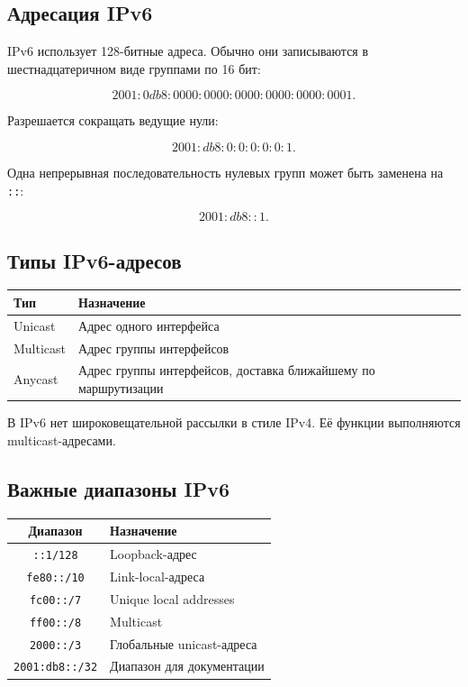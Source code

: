 \documentclass[12pt,a4paper]{article}
\begin{document}
\subsection{Адресация IPv6}

IPv6 использует 128-битные адреса. Обычно они записываются в шестнадцатеричном виде группами по 16 бит:

\[
2001:0db8:0000:0000:0000:0000:0000:0001.
\]

Разрешается сокращать ведущие нули:

\[
2001:db8:0:0:0:0:0:1.
\]

Одна непрерывная последовательность нулевых групп может быть заменена на \texttt{::}:

\[
2001:db8::1.
\]

\subsection{Типы IPv6-адресов}

\begin{center}
\begin{tabular}{|p{4cm}|p{9cm}|}
\hline
\textbf{Тип} & \textbf{Назначение} \\
\hline
Unicast & Адрес одного интерфейса \\
\hline
Multicast & Адрес группы интерфейсов \\
\hline
Anycast & Адрес группы интерфейсов, доставка ближайшему по маршрутизации \\
\hline
\end{tabular}
\end{center}

В IPv6 нет широковещательной рассылки в стиле IPv4. Её функции выполняются multicast-адресами.

\subsection{Важные диапазоны IPv6}

\begin{center}
\begin{tabular}{|c|p{8cm}|}
\hline
\textbf{Диапазон} & \textbf{Назначение} \\
\hline
\texttt{::1/128} & Loopback-адрес \\
\hline
\texttt{fe80::/10} & Link-local-адреса \\
\hline
\texttt{fc00::/7} & Unique local addresses \\
\hline
\texttt{ff00::/8} & Multicast \\
\hline
\texttt{2000::/3} & Глобальные unicast-адреса \\
\hline
\texttt{2001:db8::/32} & Диапазон для документации \\
\hline
\end{tabular}
\end{center}
\end{document}
